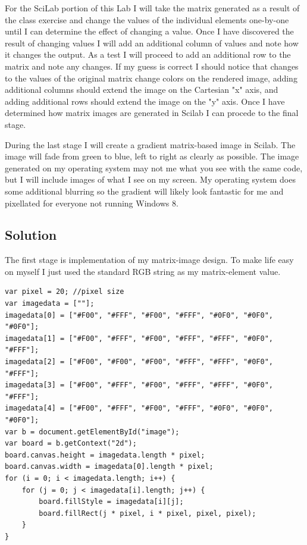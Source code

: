 For the SciLab portion of this Lab I will take the matrix generated as a result of the class exercise and change the values of the individual elements one-by-one until I can determine the effect of changing a value. Once I have discovered the result of changing values I will add an additional column of values and note how it changes the output. As a test I will proceed to add an additional row to the matrix and note any changes. If my guess is correct I should notice that changes to the values of the original matrix change colors on the rendered image, adding additional columns should extend the image on the Cartesian "x" axis, and adding additional rows should extend the image on the "y" axis. Once I have determined how matrix images are generated in Scilab I can procede to the final stage.

During the last stage I will create a gradient matrix-based image in Scilab. The image will fade from green to blue, left to right as clearly as possible. The image generated on my operating system may not me what you see with the same code, but I will include images of what I see on my screen. My operating system does some additional blurring so the gradient will likely look fantastic for me and pixellated for everyone not running Windows 8.

\subsection{Solution}
The first stage is implementation of my matrix-image design. To make life easy on myself I just used the standard RGB string as my matrix-element value.
\begin{lstlisting}[caption=Define Image Data]
var pixel = 20; //pixel size
var imagedata = [""];
imagedata[0] = ["#F00", "#FFF", "#F00", "#FFF", "#0F0", "#0F0", "#0F0"];
imagedata[1] = ["#F00", "#FFF", "#F00", "#FFF", "#FFF", "#0F0", "#FFF"];
imagedata[2] = ["#F00", "#F00", "#F00", "#FFF", "#FFF", "#0F0", "#FFF"];
imagedata[3] = ["#F00", "#FFF", "#F00", "#FFF", "#FFF", "#0F0", "#FFF"];
imagedata[4] = ["#F00", "#FFF", "#F00", "#FFF", "#0F0", "#0F0", "#0F0"];
var b = document.getElementById("image");
var board = b.getContext("2d");
board.canvas.height = imagedata.length * pixel;
board.canvas.width = imagedata[0].length * pixel;
for (i = 0; i < imagedata.length; i++) {
    for (j = 0; j < imagedata[i].length; j++) {
        board.fillStyle = imagedata[i][j];
        board.fillRect(j * pixel, i * pixel, pixel, pixel);
    }
}
\end{lstlisting}

